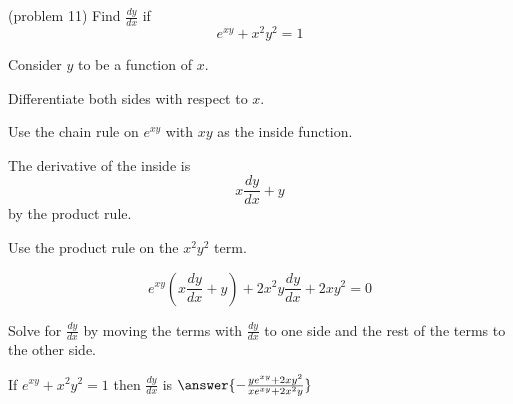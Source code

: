 \documentclass[handout]{ximera}
\begin{document}
\begin{problem} (problem 11)
  Find $\frac{dy}{dx}$ if
  \[
  e^{xy} + x^2y^2 = 1
  \]
  
	  
    \begin{hint}
      Consider $y$ to be a function of $x$.
    \end{hint}
		\begin{hint}
		  Differentiate both sides with respect to $x$.
		\end{hint}
    \begin{hint}
      Use the chain rule on $e^{xy}$ with $xy$ as the inside function.
    \end{hint}
    \begin{hint}
      The derivative of the inside is 
      \[
      x\frac{dy}{dx} + y
      \]
			by the product rule.
    \end{hint}
		\begin{hint}
      Use the product rule on the $x^2y^2$ term.
    \end{hint}
		\begin{hint}
		  \[
			e^{xy} \left( x\frac{dy}{dx} + y\right) + 2x^2y \frac{dy}{dx} + 2xy^2 = 0
			\]
		\end{hint}
		\begin{hint}
		  Solve for $\frac{dy}{dx}$ by moving the terms with $\frac{dy}{dx}$ to one side and the 
			rest of the terms to the other side.
		\end{hint}
    
		If $e^{xy} + x^2y^2 = 1$ then $\frac{dy}{dx}$ is
		 $\answer{-\frac{ye^{xy} +2xy^2}{xe^{xy} + 2x^2y}}$
		
\end{problem}




\begin{center}
\begin{foldable}
\end{foldable}
\end{center}
\end{document}
